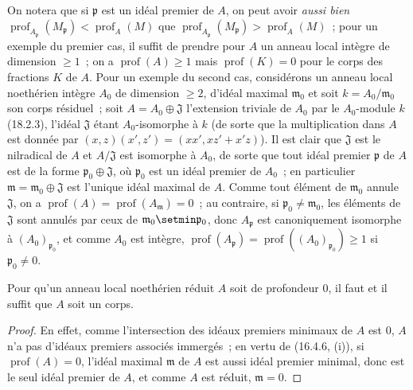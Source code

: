 \begin{env}[16.4.6.4]
\label{0.16.4.6.4-fr}
On notera que si $\mathfrak{p}$ est un idéal premier de $A$, on peut avoir
\emph{aussi bien}
$\operatorname{prof}_{A_{\mathfrak{p}}}(M_{\mathfrak{p}})
<\operatorname{prof}_A(M)$ que
$\operatorname{prof}_{A_{\mathfrak{p}}}(M_{\mathfrak{p}})
>\operatorname{prof}_A(M)$~; pour un exemple du premier cas,
il suffit de prendre pour $A$ un anneau local intègre de dimension $\geq1$~; on a
$\operatorname{prof}(A)\geq1$ mais $\operatorname{prof}(K)=0$ pour le corps
des fractions $K$ de $A$. Pour un exemple du second cas, considérons un
anneau local noethérien intègre $A_0$ de dimension $\geq2$, d'idéal maximal
$\mathfrak{m}_0$ et soit $k=A_0/\mathfrak{m}_0$ son corps résiduel~; soit
$A=A_0\oplus\mathfrak{J}$ l'extension triviale de $A_0$ par le $A_0$-module
$k$ (18.2.3), l'idéal $\mathfrak{J}$ étant $A_0$-isomorphe à $k$ (de sorte
que la multiplication dans $A$ est donnée par
$(x,z)(x',z')=(xx',xz'+x'z)$). Il est clair que $\mathfrak{J}$ est le
nilradical de $A$ et $A/\mathfrak{J}$ est isomorphe à $A_0$, de sorte que
tout idéal premier $\mathfrak{p}$ de $A$ est de la forme
$\mathfrak{p}_0\oplus\mathfrak{J}$, où $\mathfrak{p}_0$ est un idéal premier
de $A_0$~; en particulier $\mathfrak{m}=\mathfrak{m}_0\oplus\mathfrak{J}$
est l'unique idéal maximal de $A$. Comme tout élément de $\mathfrak{m}_0$
annule $\mathfrak{J}$, on a
$\operatorname{prof}(A)=\operatorname{prof}(A_{\mathfrak{m}})=0$~; au
contraire, si $\mathfrak{p}_0\neq\mathfrak{m}_0$, les éléments de
$\mathfrak{J}$ sont annulés par ceux de
$\mathfrak{m}_0\setmin\mathfrak{p}_0$, donc $A_{\mathfrak{p}}$ est canoniquement
isomorphe à $(A_0)_{\mathfrak{p}_0}$, et comme $A_0$ est intègre,
$\operatorname{prof}(A_{\mathfrak{p}})
=\operatorname{prof}((A_0)_{\mathfrak{p}_0})\geq1$ si
$\mathfrak{p}_0\neq0$.
\end{env}

\begin{corollary}[16.4.7]
\label{0.16.4.7-fr}
Pour qu'un anneau local noethérien réduit $A$ soit de profondeur $0$, il faut
et il suffit que $A$ soit un corps.
\end{corollary}

\begin{proof}
En effet, comme l'intersection des idéaux premiers minimaux de $A$ est $0$,
$A$ n'a pas d'idéaux premiers associés immergés~; en vertu de (16.4.6, (i)),
si $\operatorname{prof}(A)=0$, l'idéal maximal $\mathfrak{m}$ de $A$ est
aussi idéal premier minimal, donc est le seul idéal premier de $A$, et
comme $A$ est réduit, $\mathfrak{m}=0$.
\end{proof}

